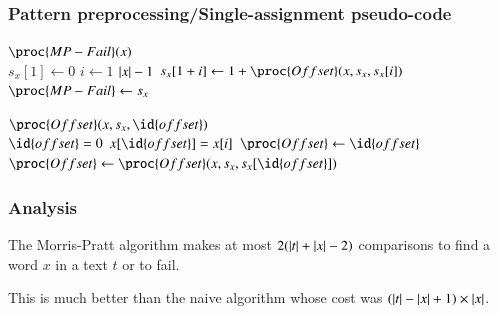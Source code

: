 %
\begin{frame}
\frametitle{Pattern preprocessing/Single-assignment pseudo-code}

\begin{codebox}
\(\proc{MP-Fail}(x)\)\\
\li \(s_{x}[1] \gets 0\)
\li \For \(i \gets 1\) \To \(\lvert{x}\lvert{}-1\)
\li \Do \(s_{x}[1 + i] \gets 1 + \proc{Offset} (x, s_{x}, s_{x}[i])\)
    \End
\li \(\proc{MP-Fail} \gets s_{x}\)
\end{codebox}
\begin{codebox}
\(\proc{Offset} (x, s_{x}, \id{offset})\)\\
\li \If \(\id{offset} = 0\) \LogOr \(x[\id{offset}] = x[i]\)
\li \Then \(\proc{Offset} \gets \id{offset}\)
\li \Else \(\proc{Offset} \gets \proc{Offset} (x, s_{x},
                                               s_{x}[\id{offset}])\)
    \End
\end{codebox}

\end{frame}

%
\begin{frame}
\frametitle{Analysis}

The Morris-Pratt algorithm makes at most \(2 (\lvert{t}\lvert{} + \lvert{x}\lvert{} - 2)\)
comparisons to find a word \(x\) in a text \(t\) or to fail.

\bigskip

This is much better than the naive algorithm whose cost was \((\lvert{t}\lvert{}
- \lvert{x}\lvert{} + 1) \times \lvert{x}\lvert{}\).

\end{frame}
